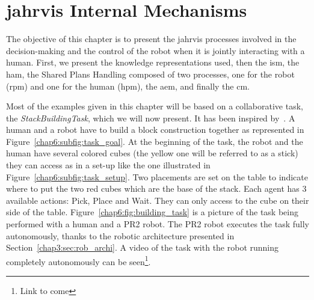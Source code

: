 \documentclass[a4paper,11pt,twoside]{StyleThese}
\begin{document}
	\setcounter{chapter}{5} %
	\dominitoc
	\faketableofcontents
	\fi

\chapter{\acrshort{jahrvis} Internal Mechanisms}\label{chapter:chap6}
\minitoc

The objective of this chapter is to present the \acrshort{jahrvis} processes involved in the decision-making and the control of the robot when it is jointly interacting with a human. First, we present the knowledge representations used, then the \acrlong{ism}, the \acrlong{ham}, the Shared Plans Handling composed of two processes, one for the robot (\acrlong{rpm}) and one for the human (\acrlong{hpm}), the \acrlong{aem}, and finally the \acrlong{cm}.

Most of the examples given in this chapter will be based on a collaborative task, the \emph{StackBuildingTask}, which we will now present. It has been inspired by~\cite{devin_2017_decisions}. A human and a robot have to build a block construction together as represented in Figure~\ref{chap6:subfig:task_goal}. At the beginning of the task, the robot and the human have several colored cubes (the yellow one will be referred to as a stick) they can access as in a set-up like the one illustrated in Figure~\ref{chap6:subfig:task_setup}. Two placements are set on the table to indicate where to put the two red cubes which are the base of the stack. Each agent has 3 available actions: Pick, Place and Wait. They can only access to the cube on their side of the table. Figure~\ref{chap6:fig:building_task} is a picture of the task being performed with a human and a PR2 robot. The PR2 robot executes the task fully autonomously, thanks to the robotic architecture presented in Section~\ref{chap3:sec:rob_archi}. A video of the task with the robot running completely autonomously can be seen\footnote{Link to come}.
\end{document}
